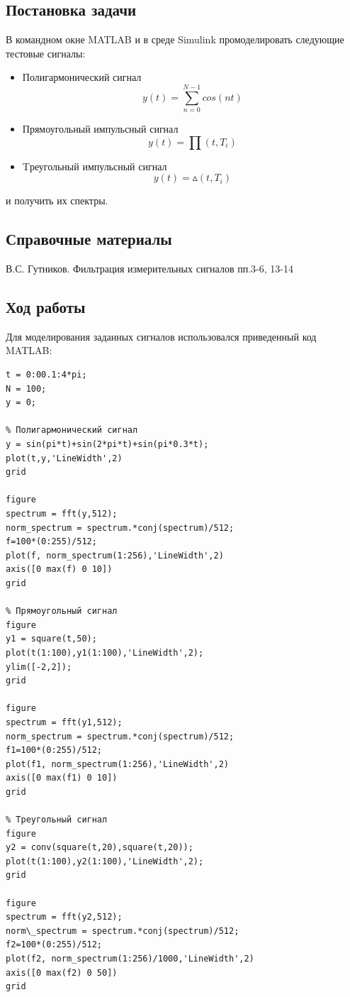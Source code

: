 \documentclass[10pt,a4paper]{article}
\begin{document}
\subsection{Постановка задачи}
В командном окне MATLAB и в среде Simulink промоделировать следующие тестовые сигналы:
\begin{itemize}
\item Полигармонический сигнал 
	\begin{equation}
	y(t) = \sum_{n=0}^{{N}-1}cos{(nt)}
	\end{equation}
\item Прямоугольный импульсный сигнал
	\begin{equation}
	y(t) = \prod(t, T_i)
	\end{equation}
\item Tреугольный импульсный сигнал
	\begin{equation}
	y(t) = \vartriangle(t, T_i)
	\end{equation}
\end{itemize}
и получить их спектры.
\subsection{Справочные материалы}
В.С. Гутников. Фильтрация измерительных сигналов пп.3-6, 13-14
\subsection{Ход работы}
Для моделирования заданных сигналов использовался приведенный код MATLAB:

\begin{verbatim}
t = 0:00.1:4*pi;
N = 100;
y = 0;

% Полигармонический сигнал
y = sin(pi*t)+sin(2*pi*t)+sin(pi*0.3*t);
plot(t,y,'LineWidth',2)
grid

figure
spectrum = fft(y,512);
norm_spectrum = spectrum.*conj(spectrum)/512;
f=100*(0:255)/512;
plot(f, norm_spectrum(1:256),'LineWidth',2)
axis([0 max(f) 0 10])
grid

% Прямоугольный сигнал
figure
y1 = square(t,50);
plot(t(1:100),y1(1:100),'LineWidth',2);
ylim([-2,2]);
grid

figure
spectrum = fft(y1,512);
norm_spectrum = spectrum.*conj(spectrum)/512;
f1=100*(0:255)/512;
plot(f1, norm_spectrum(1:256),'LineWidth',2)
axis([0 max(f1) 0 10])
grid

% Треугольный сигнал
figure
y2 = conv(square(t,20),square(t,20));
plot(t(1:100),y2(1:100),'LineWidth',2);
grid

figure
spectrum = fft(y2,512);
norm\_spectrum = spectrum.*conj(spectrum)/512;
f2=100*(0:255)/512;
plot(f2, norm_spectrum(1:256)/1000,'LineWidth',2)
axis([0 max(f2) 0 50])
grid
\end{verbatim}
\end{document}
